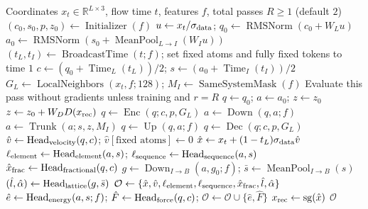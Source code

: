 \documentclass{article} %
\begin{document}
\begin{algorithm}[htbp]
  \caption{Zatom-2 forward pass with coordinate recycling and multitask readouts.}
  \label{alg:zatom2-forward}
  \small
  \begin{algorithmic}[1]
    \Require Coordinates $x_t\in\mathbb{R}^{L\times3}$, flow time $t$, features $f$,
      total passes $R\geq1$ (default $2$)
    \State $(c_0,s_0,p,z_0)\gets\operatorname{Initializer}(f)$
    \State $u\gets x_t/\sigma_{\rm data}$;
      $q_0\gets\operatorname{RMSNorm}(c_0+W_Lu)$
    \State $a_0\gets\operatorname{RMSNorm}(s_0+\operatorname{MeanPool}_{L\to I}(W_Iu))$
    \State $(t_L,t_I)\gets\operatorname{BroadcastTime}(t;f)$;
      set fixed atoms and fully fixed tokens to time $1$
    \State $c\gets(q_0+\operatorname{Time}_L(t_L))/2$;
      $s\gets(a_0+\operatorname{Time}_I(t_I))/2$
    \State $G_L\gets\operatorname{LocalNeighbors}(x_t,f;128)$;
      $M_I\gets\operatorname{SameSystemMask}(f)$
      \State Evaluate this pass without gradients unless training and $r=R$
      \State $q\gets q_0$; $a\gets a_0$; $z\gets z_0$
        \State $z\gets z_0+W_D D(x_{\rm rec})$
      \EndIf
      \State $q\gets\operatorname{Enc}(q;c,p,G_L)$
      \State $a\gets\operatorname{Down}(q,a;f)$
      \State $a\gets\operatorname{Trunk}(a;s,z,M_I)$
      \State $q\gets\operatorname{Up}(q,a;f)$
      \State $q\gets\operatorname{Dec}(q;c,p,G_L)$
      \State $\hat v\gets\operatorname{Head}_{\rm velocity}(q,c)$;
        $\hat v[\text{fixed atoms}]\gets0$
      \State $\hat x\gets x_t+(1-t_L)\sigma_{\rm data}\hat v$
      \State $\ell_{\rm element}\gets\operatorname{Head}_{\rm element}(a,s)$;
        $\ell_{\rm sequence}\gets\operatorname{Head}_{\rm sequence}(a,s)$
      \State $\hat x_{\rm frac}\gets\operatorname{Head}_{\rm fractional}(q,c)$
      \State $g\gets\operatorname{Down}_{I\to B}(a,g_0;f)$;
        $\bar s\gets\operatorname{MeanPool}_{I\to B}(s)$
      \State $(\hat l,\hat\alpha)\gets\operatorname{Head}_{\rm lattice}(g,\bar s)$
      \State $\mathcal O\gets\{\hat x,\hat v,\ell_{\rm element},\ell_{\rm sequence},
        \hat x_{\rm frac},\hat l,\hat\alpha\}$
        \State $\hat e\gets\operatorname{Head}_{\rm energy}(a,s;f)$;
          $\hat F\gets\operatorname{Head}_{\rm force}(q,c)$;
          $\mathcal O\gets\mathcal O\cup\{\hat e,\hat F\}$
      \EndIf
      \State $x_{\rm rec}\gets\operatorname{sg}(\hat x)$
    \EndFor
    \State \Return $\mathcal O$
  \end{algorithmic}
\end{algorithm}
\FloatBarrier
\end{document}
